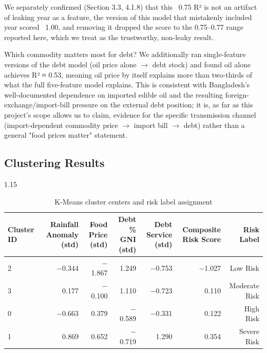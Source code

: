 \documentclass[12pt,a4paper]{article}
\begin{document}
We separately confirmed (Section 3.3, 4.1.8) that this ~0.75 R² is not an artifact of leaking year as a feature, the version of this model that mistakenly included year scored ~1.00, and removing it dropped the score to the 0.75--0.77 range reported here, which we treat as the trustworthy, non-leaky result.

Which commodity matters most for debt? We additionally ran single-feature versions of the debt model (oil price alone $\rightarrow$ debt stock) and found oil alone achieves R² ≈ 0.53, meaning oil price by itself explains more than two-thirds of what the full five-feature model explains. This is consistent with Bangladesh's well-documented dependence on imported edible oil and the resulting foreign-exchange/import-bill pressure on the external debt position; it is, as far as this project's scope allows us to claim, evidence for the specific transmission channel (import-dependent commodity price $\rightarrow$ import bill $\rightarrow$ debt) rather than a general "food prices matter" statement.
\subsection{Clustering Results}
\begin{table}[H]
\centering
\begin{spacing}{1.15}
\caption{K-Means cluster centers and risk label assignment}
\label{tab:clustcenters}
\setlength{\tabcolsep}{5pt}
\small
\begin{tabular}{lrrrrrr}
\toprule
\textbf{Cluster ID} & \textbf{Rainfall Anomaly (std)} & \textbf{Food Price (std)} & \textbf{Debt \% GNI (std)} & \textbf{Debt Service (std)} & \textbf{Composite Risk Score} & \textbf{Risk Label} \\
\midrule
2 & $-$0.344 & $-$1.867 &  1.249 & $-$0.753 & $-$1.027 & Low Risk      \\
3 &  0.177   & $-$0.100 &  1.110 & $-$0.723 &  0.110   & Moderate Risk \\
0 & $-$0.663 &  0.379   & $-$0.589 & $-$0.331 & 0.122  & High Risk     \\
1 &  0.869   &  0.652   & $-$0.719 &  1.290   & 0.354  & Severe Risk   \\
\bottomrule
\end{tabular}
\end{spacing}
\end{table}
\end{document}
